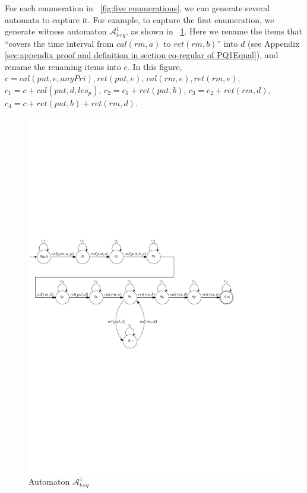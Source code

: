 For each enumeration in \figurename~\ref{fig:five enumerations}, we can generate several automata to capture it. For example, to capture the first enumeration, we generate witness automaton $\mathcal{A}_{\textit{l-eq}}^1$, as shown in \figurename~\ref{fig:automata for first enumeration of PQ1Equal not in appendix}. Here we rename the items that ``covers the time interval from $\textit{cal}(\textit{rm},a)$ to $\textit{ret}(\textit{rm},b)$'' into $d$ (see Appendix \ref{sec:appendix proof and definition in section co-regular of PQ1Equal}), and rename the renaming items into $e$. In this figure, $c = \textit{cal}(\textit{put},e,\textit{anyPri}),\textit{ret}(\textit{put},e)$, $\textit{cal}(\textit{rm},e), \textit{ret}(\textit{rm},e)$, $c_1 = c + \textit{cal}(\textit{put},d,\textit{les}_p)$, $c_2 = c_1 + \textit{ret}(\textit{put},b)$, $c_3 = c_2 + \textit{ret}(\textit{rm},d)$, $c_4 = c + \textit{ret}(\textit{put},b) + \textit{ret}(\textit{rm},d)$.

\begin{figure}[htbp]
  \centering
  \includegraphics[width=0.8 \textwidth]{figures/PIC_AUTO_PQ1Equ-1.pdf}
  \caption{Automaton $\mathcal{A}_{\textit{l-eq}}^1$}
  \label{fig:automata for first enumeration of PQ1Equal not in appendix}
\end{figure}

